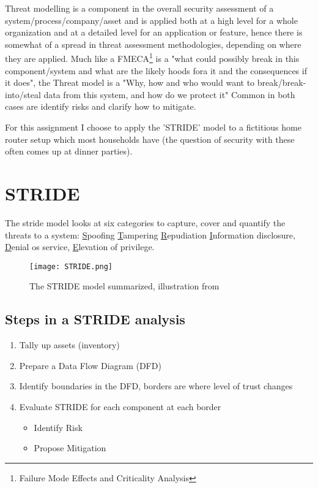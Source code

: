 \documentclass[
	letterpaper, %
	10pt, %
	unnumberedsections, %
	twoside, %
]{APAAssignment}
\begin{document}
Threat modelling is a component in the overall security assessment of a system/process/company/asset and is applied both at a high level for a whole organization and at a detailed level for an application or feature, hence there is somewhat of a spread in threat assessment methodologies\cite{12Methods}, depending on where they are applied. Much like a FMECA\footnote{Failure Mode Effects and Criticality Analysis} is a "what could possibly break in this component/system and what are the likely hoods fora it and the consequences if it does", the Threat model is a "Why, how and who would want to break/break-into/steal data from this system, and how do we protect it" Common in both cases are identify risks and clarify how to mitigate.

For this assignment I choose to apply the 'STRIDE' model to a fictitious home router setup which most households have (the question of security with these often comes up at dinner parties).

\section{STRIDE}

The stride model looks at six categories to capture, cover and quantify the threats to a system: \underline{S}poofing \underline{T}ampering \underline{R}epudiation \underline{I}nformation disclosure, \underline{D}enial os service, \underline{E}levation of privilege. 



\begin{figure}[!htp] %
	\centering
	\texttt{[image: STRIDE.png]}
	\caption{The STRIDE model summarized, illustration from \cite{STRIDE_For_pay_Medium}}
	\label{fig:STRIDE}
\end{figure}

\subsection{Steps in a STRIDE analysis}

\begin{spacing}{1}
\begin{enumerate}
	\item Tally up assets (inventory)
	\item Prepare a Data Flow Diagram (DFD)
	\item Identify boundaries in the DFD, borders are where level of trust changes
	\item Evaluate STRIDE for each component at each border
	\begin{itemize}
		\item Identify Risk 
		\item Propose Mitigation
	\end{itemize} 
\end{enumerate}
\end{spacing}
\end{document}
